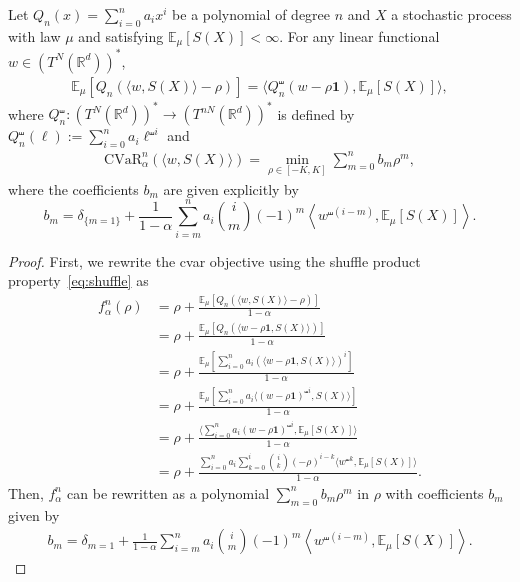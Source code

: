 \documentclass[twoside,11pt]{article}
\numberwithin{equation}{section}
\numberwithin{theorem}{section}
\newcommand{\R}{\mathbb{R}}
\newcommand{\ex}{\mathbb{E}}
\newcommand{\id}{\mathbf{1}}
\begin{document}
\begin{theorem}\label{thm:cvar_shuffle} Let $Q_n(x)=\sum_{i=0}^{n}a_ix^i$ be a polynomial of degree $n$ and $X$ a stochastic process with law $\mu$ and satisfying $\ex_\mu[S(X)]<\infty$.
For any linear functional $w\in (T^N(\R^d))^*$,
 \begin{align*}
\ex_\mu[Q_n(\langle w, S(X)\rangle-\rho)]=\langle Q_n^{\shuffle}(w-\rho\id), \ex_\mu[S(X)]\rangle,
\end{align*}
where $Q_n^{\shuffle}:(T^N(\R^d))^*\to (T^{nN}(\R^d))^*$ is defined by 
$Q_n^{\shuffle}(\ell) := \sum_{i=0}^{n} a_i \ell ^{\shuffle i}$ and 
\begin{align*}
\mathrm{CVaR}^n_\alpha(\langle w,S(X)\rangle) = \min_{\rho\in[-K,K]} \sum_{m=0}^{n} b_m \rho^m,
  \end{align*}
where the coefficients $b_m$ are given explicitly by
$$
b_m = \delta_{\{m=1\}} + \frac{1}{1 - \alpha} \sum_{i = m}^{n} a_i \binom{i}{m} (-1)^m \left\langle w^{\shuffle (i - m)}, \mathbb{E}_\mu[S(X)] \right\rangle. 
$$
\end{theorem}
\begin{proof}
First, we rewrite the \acrshort{cvar} objective using the shuffle product property~\eqref{eq:shuffle} as 
\begin{align*}
    f^n_\alpha(\rho) &= \rho + \frac{\ex_\mu[Q_n(\langle w,S(X)\rangle-\rho)]}{1-\alpha} \\ 
      &=\rho + \frac{\ex_\mu[Q_n(\langle w-\rho  \id,S(X)\rangle)]}{1-\alpha}\\
      &=\rho + \frac{\ex_\mu[\sum_{i=0}^{n}a_i(\langle w-\rho  \id,S(X)\rangle)^i]}{1-\alpha} \\ 
      &=\rho + \frac{\ex_\mu[\sum_{i=0}^{n}a_i\langle (w-\rho  \id)^{\shuffle i},S(X)\rangle]}{1-\alpha} \\ 
      &=\rho + \frac{\langle \sum_{i=0}^{n}a_i (w-\rho  \id)^{\shuffle i},\ex_\mu[S(X)]\rangle}{1-\alpha}  \\ 
      &= \rho + \frac{\sum_{i=0}^{n}a_i \sum_{k=0}^{i}\binom{i}{k} (-\rho)^{i - k}\langle w^{\shuffle k},\ex_\mu[S(X)]\rangle}{1-\alpha}.
\end{align*}
Then, $f^n_\alpha$ can be rewritten as a polynomial $\sum_{m=0}^{n}b_m \rho^m$ in $\rho$ with coefficients $b_m$ given by
\begin{align*}
    b_m = \delta_{m=1} + \frac{1}{1 - \alpha} \sum_{i = m}^{n} a_i \binom{i}{m} (-1)^m \left\langle w^{\shuffle (i - m)}, \mathbb{E}_\mu[S(X)] \right\rangle.
\end{align*}
\end{proof}
\end{document}
